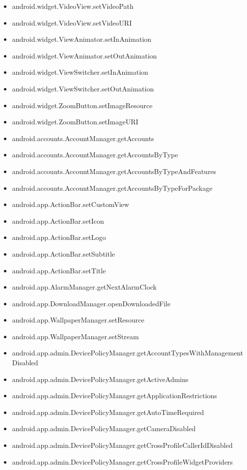 \documentclass{sig-alternate}
\begin{document}
\begin{itemize}
\item android.widget.VideoView.setVideoPath
\item android.widget.VideoView.setVideoURI
\item android.widget.ViewAnimator.setInAnimation
\item android.widget.ViewAnimator.setOutAnimation
\item android.widget.ViewSwitcher.setInAnimation
\item android.widget.ViewSwitcher.setOutAnimation
\item android.widget.ZoomButton.setImageResource
\item android.widget.ZoomButton.setImageURI
\item android.accounts.AccountManager.getAccounts
\item android.accounts.AccountManager.getAccountsByType
\item android.accounts.AccountManager.getAccountsByTypeAndFeatures
\item android.accounts.AccountManager.getAccountsByTypeForPackage
\item android.app.ActionBar.setCustomView
\item android.app.ActionBar.setIcon
\item android.app.ActionBar.setLogo
\item android.app.ActionBar.setSubtitle
\item android.app.ActionBar.setTitle
\item android.app.AlarmManager.getNextAlarmClock
\item android.app.DownloadManager.openDownloadedFile
\item android.app.WallpaperManager.setResource
\item android.app.WallpaperManager.setStream
\item android.app.admin.DevicePolicyManager.getAccountTypesWithManagementDisabled
\item android.app.admin.DevicePolicyManager.getActiveAdmins
\item android.app.admin.DevicePolicyManager.getApplicationRestrictions
\item android.app.admin.DevicePolicyManager.getAutoTimeRequired
\item android.app.admin.DevicePolicyManager.getCameraDisabled
\item android.app.admin.DevicePolicyManager.getCrossProfileCallerIdDisabled
\item android.app.admin.DevicePolicyManager.getCrossProfileWidgetProviders

\end{itemize}
\end{document}
